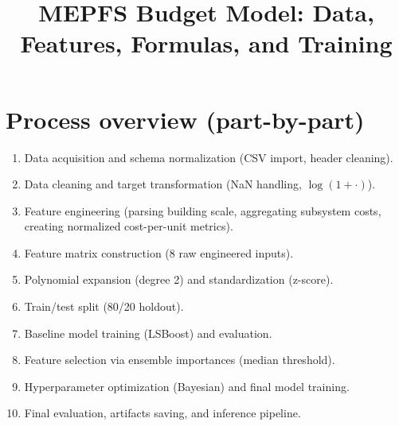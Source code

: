 \documentclass[11pt]{article}
\title{MEPFS Budget Model: Data, Features, Formulas, and Training}
\author{}
\date{}
\begin{document}
\maketitle

\section*{Process overview (part-by-part)}
\begin{enumerate}[label=Part~\arabic*:, leftmargin=*]
  \item Data acquisition and schema normalization (CSV import, header cleaning).
  \item Data cleaning and target transformation (NaN handling, $\log(1+\cdot)$).
  \item Feature engineering (parsing building scale, aggregating subsystem costs, creating normalized cost-per-unit metrics).
  \item Feature matrix construction (8 raw engineered inputs).
  \item Polynomial expansion (degree 2) and standardization (z-score).
  \item Train/test split (80/20 holdout).
  \item Baseline model training (LSBoost) and evaluation.
  \item Feature selection via ensemble importances (median threshold).
  \item Hyperparameter optimization (Bayesian) and final model training.
  \item Final evaluation, artifacts saving, and inference pipeline.
\end{enumerate}
\end{document}
